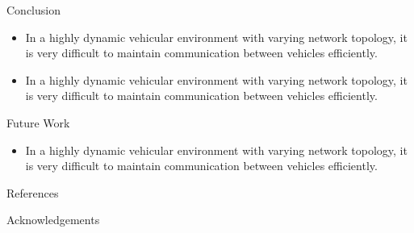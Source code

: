 \documentclass[final]{beamer}
\newlength{\onecolwid}
\begin{document}
\begin{frame}[t]
\begin{columns}[t]
\begin{column}{\onecolwid}
\begin{block}{Conclusion}

\begin{itemize}
\item In a highly dynamic vehicular environment with varying network topology, it is very difficult to maintain communication between vehicles efficiently.

\item In a highly dynamic vehicular environment with varying network topology, it is very difficult to maintain communication between vehicles efficiently.
\end{itemize}
\end{block}


\begin{block}{Future Work}

\begin{itemize}
\item In a highly dynamic vehicular environment with varying network topology, it is very difficult to maintain communication between vehicles efficiently.
\end{itemize}
\end{block}


\begin{block}{References}

\nocite{*} %
\small{
\vspace{0.75in}}

\end{block}



\begin{alertblock}{Acknowledgements}


\end{alertblock}
\end{column}
\end{columns}
\end{frame}
\end{document}
